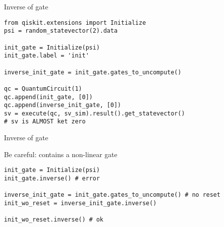 
\begin{frame}[fragile]{Inverse of  gate}

\begin{verbatim}
from qiskit.extensions import Initialize
psi = random_statevector(2).data

init_gate = Initialize(psi)
init_gate.label = 'init'

inverse_init_gate = init_gate.gates_to_uncompute()

qc = QuantumCircuit(1)
qc.append(init_gate, [0])
qc.append(inverse_init_gate, [0])
sv = execute(qc, sv_sim).result().get_statevector()
# sv is ALMOST ket zero
\end{verbatim}

\end{frame}


\begin{frame}[fragile]{Inverse of  gate}

Be careful:  contains a non-linear  gate \bigskip

\begin{verbatim}
init_gate = Initialize(psi)
init_gate.inverse() # error

inverse_init_gate = init_gate.gates_to_uncompute() # no reset
init_wo_reset = inverse_init_gate.inverse()

init_wo_reset.inverse() # ok
\end{verbatim}

\end{frame}
